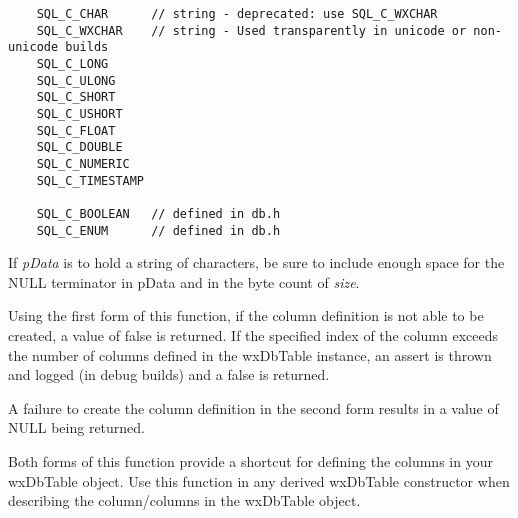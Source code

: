 
\begin{verbatim}
    SQL_C_CHAR      // string - deprecated: use SQL_C_WXCHAR
    SQL_C_WXCHAR    // string - Used transparently in unicode or non-unicode builds
    SQL_C_LONG
    SQL_C_ULONG
    SQL_C_SHORT
    SQL_C_USHORT
    SQL_C_FLOAT
    SQL_C_DOUBLE
    SQL_C_NUMERIC
    SQL_C_TIMESTAMP

    SQL_C_BOOLEAN   // defined in db.h
    SQL_C_ENUM      // defined in db.h
\end{verbatim}




If {\it pData} is to hold a string of characters, be sure to include enough
space for the NULL terminator in pData and in the byte count of {\it size}.

Using the first form of this function, if the column definition is not able 
to be created, a value of false is returned.  If the specified index of the 
column exceeds the number of columns defined in the wxDbTable instance, an
assert is thrown and logged (in debug builds) and a false is returned.

A failure to create the column definition in the second form results in a 
value of NULL being returned.

Both forms of this function provide a shortcut for defining the columns in
your wxDbTable object.  Use this function in any derived wxDbTable
constructor when describing the column/columns in the wxDbTable object.

